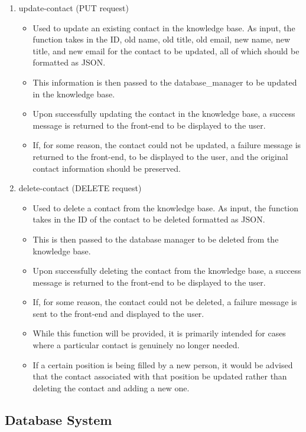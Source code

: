 \documentclass[titlepage, 12pt]{article}
\begin{document}
\begin{enumerate}
\begin{itemize}
    \end{itemize}
    \item update-contact (PUT request)
    \begin{itemize}
        \item Used to update an existing contact in the knowledge base. As input, the function takes in the ID, old name, old title, old email, new name, new title, and new email for the contact to be updated, all of which should be formatted as JSON.
        \item This information is then passed to the database\_manager to be updated in the knowledge base.
        \item Upon successfully updating the contact in the knowledge base, a success message is returned to the front-end to be displayed to the user.
        \item If, for some reason, the contact could not be updated, a failure message is returned to the front-end, to be displayed to the user, and the original contact information should be preserved.
    \end{itemize}
    \item delete-contact (DELETE request)
    \begin{itemize}
        \item Used to delete a contact from the knowledge base. As input, the function takes in the ID of the contact to be deleted formatted as JSON.
        \item This is then passed to the database manager to be deleted from the knowledge base.
        \item Upon successfully deleting the contact from the knowledge base, a success message is returned to the front-end to be displayed to the user.
        \item If, for some reason, the contact could not be deleted, a failure message is sent to the front-end and displayed to the user.
        \item While this function will be provided, it is primarily intended for cases where a particular contact is genuinely no longer needed.
        \item If a certain position is being filled by a new person, it would be advised that the contact associated with that position be updated rather than deleting the contact and adding a new one.
    \end{itemize}
\end{enumerate}

\subsection{Database System}
\end{document}
